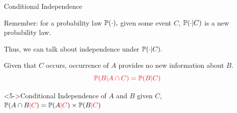 \documentclass[fleqn,aspectratio=169]{beamer}
\begin{document}
\begin{frame}{Conditional Independence}

\plitemsep 0.07in
\bci 

\item<2-> Remember: for a probability law $\mathbb{P}( \cdot ),$ given some event $C$, $\mathbb{P}( \cdot | C )$ is a new probability law. 

\item<3-> Thus, we can talk about independence under $\mathbb{P}( \cdot | C ).$

\item<4-> Given that $C$ occurs, occurrence of $A$ provides no new information about $B.$
$$
{\color{red} \mathbb{P}( B | A \cap C ) = \mathbb{P}( B | C )}
$$
\vspace{-0.2in}

\item {}

\begin{block}<5->{Conditional Independence of $A$ and $B$ given $C$, }
$\mathbb{P}( A \cap B {\color{red} | C} ) = \mathbb{P}( A {\color{red} |C} ) \times \mathbb{P}( B {\color{red} |C} )$
\end{block}




\eci 
\end{frame}
\end{document}
